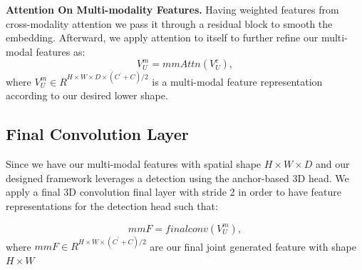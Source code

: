 \documentclass[10pt,twocolumn,letterpaper]{article}
\begin{document}
\textbf{Attention On Multi-modality Features.}
%
Having weighted features from cross-modality attention we pass it through a residual block to smooth the embedding. Afterward, we apply attention to itself to further refine our multi-modal features as: 
\begin{equation}
    V^m_{U} = mmAttn(V^c_{U}),  
    \label{mmAttn_equation}
\end{equation}
 where $V^m_{U} \in R^{H\times W\times D \times (C^\prime + C)/2}$ is a multi-modal feature representation  according to our desired lower shape.

 \subsection{Final Convolution Layer}
Since we have our multi-modal features with spatial shape $H\times W\times D$ and our designed framework leverages a detection using the anchor-based 3D head. We apply a final 3D convolution final layer with stride 2 in order to have feature representations for the detection head such that: 

\begin{equation}
    mmF = finalconv(V^m_{U}),  
    \label{finalconv_equation}
\end{equation}
%
 where $mmF \in R^{H\times W\times (C^\prime + C)/2}$ are our final joint generated feature with shape $H\times W$ 

\newline
\newline
\end{document}
